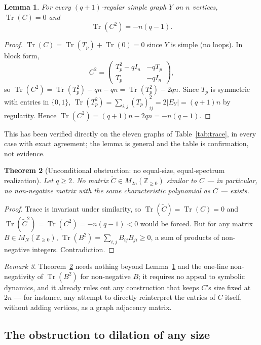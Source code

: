 \documentclass[11pt]{amsart}
\numberwithin{equation}{section}
\newtheorem{theorem}{Theorem}[section]
\newtheorem{lemma}[theorem]{Lemma}
\theoremstyle{definition}
\theoremstyle{remark}
\newtheorem{remark}[theorem]{Remark}
\newcommand{\Z}{\mathbb{Z}}
\newcommand{\Tr}{\operatorname{Tr}}
\begin{document}
\begin{lemma}\label{lem:tracecomp}
For every $(q+1)$-regular simple graph $Y$ on $n$ vertices, $\Tr(C)=0$ and
\[
\Tr(C^2)=-n(q-1).
\]
\end{lemma}

\begin{proof}
$\Tr(C)=\Tr(T_p)+\Tr(0)=0$ since $Y$ is simple (no loops). In block form,
\[
C^2=\begin{pmatrix}T_p^2-qI_n&-qT_p\\T_p&-qI_n\end{pmatrix},
\]
so $\Tr(C^2)=\Tr(T_p^2)-qn-qn=\Tr(T_p^2)-2qn$. Since $T_p$ is symmetric with entries in
$\{0,1\}$, $\Tr(T_p^2)=\sum_{i,j}(T_p)_{ij}^2=2|E_Y|=(q+1)n$ by regularity. Hence
$\Tr(C^2)=(q+1)n-2qn=-n(q-1)$.
\end{proof}

This has been verified directly on the eleven graphs of Table~\ref{tab:trace}, in every
case with exact agreement; the lemma is general and the table is confirmation, not
evidence.

\begin{theorem}[Unconditional obstruction: no equal-size, equal-spectrum realization]
\label{thm:tracesame}
Let $q\ge2$. No matrix $\widetilde C\in M_{2n}(\Z_{\ge0})$ similar to $C$ --- in
particular, no non-negative matrix with the same characteristic polynomial as $C$ ---
exists.
\end{theorem}

\begin{proof}
Trace is invariant under similarity, so $\Tr(\widetilde C)=\Tr(C)=0$ and
$\Tr(\widetilde C^2)=\Tr(C^2)=-n(q-1)<0$ would be forced. But for any matrix
$B\in M_N(\Z_{\ge0})$, $\Tr(B^2)=\sum_{i,j}B_{ij}B_{ji}\ge0$, a sum of products of
non-negative integers. Contradiction.
\end{proof}

\begin{remark}
Theorem~\ref{thm:tracesame} needs nothing beyond Lemma~\ref{lem:tracecomp} and the
one-line non-negativity of $\Tr(B^2)$ for non-negative $B$; it requires no appeal to
symbolic dynamics, and it already rules out any construction that keeps $C$'s size
fixed at $2n$ --- for instance, any attempt to directly reinterpret the entries of $C$
itself, without adding vertices, as a graph adjacency matrix.
\end{remark}

\subsection{The obstruction to dilation of any size}
\end{document}
